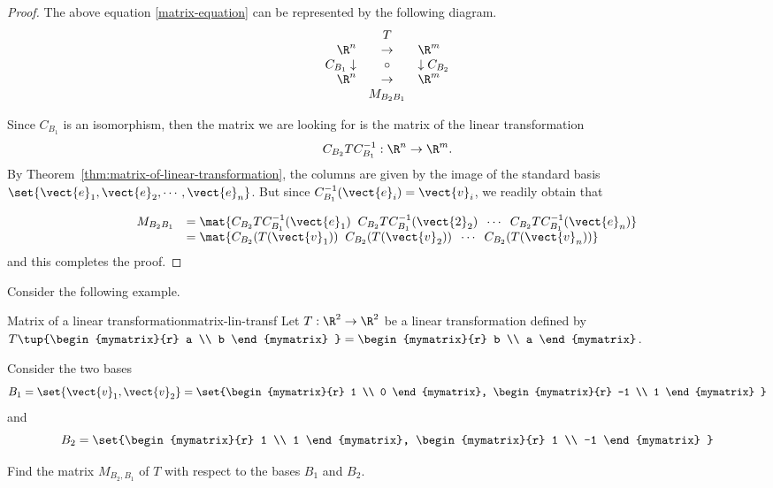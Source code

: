 \begin{proof}
The above equation {\eqref{matrix-equation}} can be represented by the following diagram.
\begin{equation*}
\begin{array}{rrcll}
&  & T &  &  \\
& \R^n & \rightarrow  & \R^m & \\
& C_{B_{1} }\downarrow  & \circ  & \downarrow C_{B_{2} } &  \\
& \R^{n} & \rightarrow  & \R^{m} &  \\
&  & M_{B_{2} B_{1} } &  &
\end{array}
\end{equation*}

Since $C_{B_1}$ is an isomorphism, then the matrix we are looking for is the matrix of the linear transformation 
\[   C_{B_2} T C^{-1}_{B_1} : \R^n \to \R^m. \]
By Theorem~\ref{thm:matrix-of-linear-transformation}, the columns are
given by the image of the standard basis $\set{\vect{e}_1,
\vect{e}_2, \cdots, \vect{e}_n }$. But since $C^{-1}_{B_1}( \vect{e}_i) = \vect{v}_i$, we readily obtain that 

\[ \begin{array}{ll} 
M_{B_{2} B_{1}} 
& = \mat{C_{B_2}T C^{-1}_{B_1} (\vect{e}_1) \;\; C_{B_2}T C^{-1}_{B_1} (\vect{2}_2) \;\; \cdots \;\; C_{B_2}T C^{-1}_{B_1} (\vect{e}_n) } \\
& = \mat{C_{B_2}(T(\vect{v}_1)) \;\; C_{B_2}(T(\vect{v}_2)) \;\; \cdots \;\; C_{B_2}(T(\vect{v}_n)) } 
\end{array}\]
and this completes the proof. 
\end{proof}

Consider the following example.

\begin{example}{Matrix of a linear transformation}{matrix-lin-transf}
Let $T: \R^2 \to \R^2$ be a linear transformation defined by $T \tup{\begin{mymatrix}{r}
a \\
b
\end{mymatrix} } = \begin{mymatrix}{r}
b \\
a 
\end{mymatrix}$. 

Consider the two bases
\[
B_1 = \set{\vect{v}_{1}, \vect{v}_{2} } = \set{\begin{mymatrix}{r}
1 \\
0
\end{mymatrix}, \begin{mymatrix}{r}
-1 \\
1
\end{mymatrix}
}
\]
 and 
\[
B_2 = \set{\begin{mymatrix}{r}
1 \\
1
\end{mymatrix}, \begin{mymatrix}{r}
1 \\
-1
\end{mymatrix}
}
\]

Find the matrix $M_{B_2,B_1}$ of $T$ with respect to the bases $B_1$ and $B_2$. 
\end{example}

